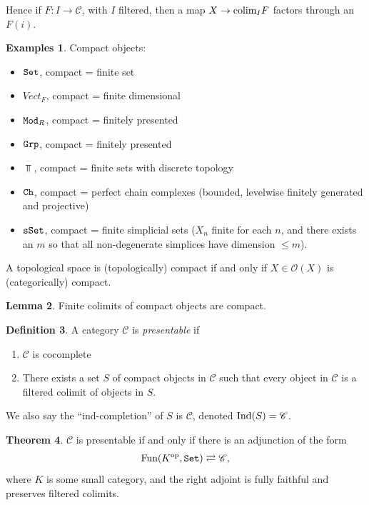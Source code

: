 \documentclass[12pt]{amsart}
\theoremstyle{definition}
\newtheorem{theorem}{Theorem}[section]
\newtheorem{definition}[theorem]{Definition}
\newtheorem{examples}[theorem]{Examples}
\newtheorem{lemma}[theorem]{Lemma}
\renewcommand{\O}{\mathcal{O}}
\providecommand{\Vect}{\textit{Vect}}
\begin{document}
Hence if $F: I \to \mathscr{C}$, with $I$ filtered, then a map $X \to \text{colim}_I F$ factors through an $F(i)$.

\begin{examples} Compact objects:
\begin{itemize}
    \item $\texttt{Set}$, compact = finite set
    \item $\Vect_F$, compact = finite dimensional
    \item $\texttt{Mod}_R$, compact = finitely presented
    \item $\texttt{Grp}$, compact = finitely presented
    \item $\Top$, compact = finite sets with discrete topology
    \item $\texttt{Ch}$, compact = perfect chain complexes (bounded, levelwise finitely generated and projective)
    \item $\texttt{sSet}$, compact = finite simplicial sets ($X_n$ finite for each $n$, and there exists an $m$ so that all non-degenerate simplices have dimension $\le m$).
\end{itemize}
\end{examples}

A topological space is (topologically) compact if and only if $X \in \O(X)$ is (categorically) compact.

\begin{lemma} Finite colimits of compact objects are compact.
\end{lemma}

\begin{definition} A category $\mathscr{C}$ is \textit{presentable} if
\begin{enumerate}
    \item $\mathscr{C}$ is cocomplete
    \item There exists a set $S$ of compact objects in $\mathscr{C}$ such that every object in $\mathscr{C}$ is a filtered colimit of objects in $S$.
\end{enumerate}
\end{definition}

We also say the ``ind-completion'' of $S$ is $\mathscr{C}$, denoted $\text{Ind}(S) = \mathscr{C}$.

\begin{theorem} $\mathscr{C}$ is presentable if and only if there is an adjunction of the form
\begin{align*}
    \text{Fun}(K^{\text{op}}, \texttt{Set}) \rightleftarrows \mathscr{C},
\end{align*}
where $K$ is some small category, and the right adjoint is fully faithful and preserves filtered colimits.
\end{theorem}
\end{document}
